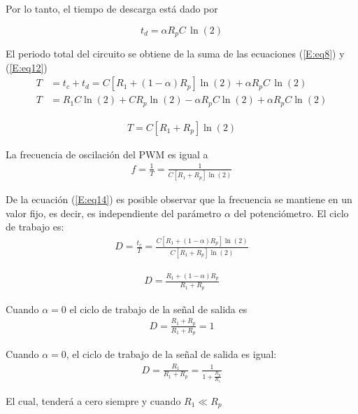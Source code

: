 \documentclass[12pt,a4paper]{article}
\begin{document}
	Por lo tanto, el tiempo de descarga está dado por
	\begin{tcolorbox}[colback=red!5!white,colframe=red!75!black]
		\begin{equation}
			\label{E:eq12}
			t_d = \alpha R_p C\, \ln(2) 
		\end{equation}
	\end{tcolorbox}

	El periodo total del circuito se obtiene de la suma de las ecuaciones (\ref{E:eq8}) y (\ref{E:eq12})
	\begin{align}
		T &= t_c + t_d = C[R_1 + (1 - \alpha)R_p]\ln(2) + \alpha R_p C \, \ln(2)\nonumber\\
		T &= R_1 C \ln(2) + CR_p \ln(2) - \alpha R_p C \ln(2) + \alpha R_p C \ln(2)\nonumber
	\end{align}

	\begin{align}
		\label{E:eq13}
		T = C[R_1 + R_p]\ln(2)
	\end{align}

	La frecuencia de oscilación del PWM es igual a
	\begin{align}
		\label{E:eq14}
		f = \frac{1}{T} = \frac{1}{C[R_1 + R_p]\ln(2)}
	\end{align}

	De la ecuación (\ref{E:eq14}) es posible observar que la frecuencia se mantiene en un valor fijo, es decir, es independiente del parámetro $\alpha$ del potenciómetro. El ciclo de trabajo es:
	\begin{align}
		D = \frac{t_c}{T} = \frac{C[R_1 + (1 - \alpha)R_p]\ln(2)}{C[R_1 + R_p]\ln(2)}\nonumber
	\end{align}

	\begin{align}
		\label{E:eq15}
		D = \frac{R_1 + (1 - \alpha)R_p}{R_1 + R_p}
	\end{align}

	Cuando $\alpha=0$ el ciclo de trabajo de la señal de salida es
	\begin{align}
		\label{E:eq16}
		D = \frac{R_1 + R_p}{R_1 + R_p} = 1
	\end{align}

	Cuando $\alpha=0$, el ciclo de trabajo de la señal de salida es igual:
 	\begin{align}
 		\label{E:eq17}
 		D = \frac{R_1}{R_1 + R_p} = \frac{1}{1 + \frac{R_p}{R_1}}
 	\end{align}
 
 	El cual, tenderá a cero siempre y cuando $R_1\ll R_p$
 	
\end{document}
